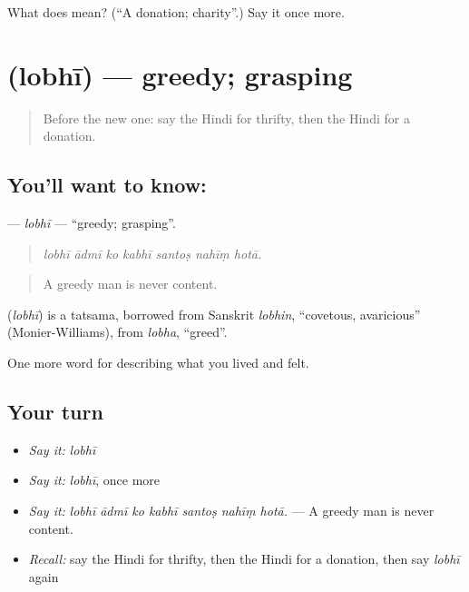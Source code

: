 \begin{tcolorbox}[breakable,colback=teal!4,colframe=teal!35!black,title={Before you move on}]
What does  mean? (\textquotedblleft{}A donation; charity\textquotedblright{}.) Say it once more.
\end{tcolorbox}
\section[\texorpdfstring{\hi{लोभी} (lobhī)}{लोभी (lobhī)}]{ (lobhī) — greedy; grasping}

\label{lesson:HI-C469-lobhi}



\begin{quote}
Before the new one: say the Hindi for thrifty, then the Hindi for a donation.
\end{quote}

\subsection*{You'll want to know: }
\textbf{} — \emph{lobhī} — \textquotedblleft{}greedy; grasping\textquotedblright{}.

\begin{quote}
      
\end{quote}

\begin{quote}
\emph{lobhī ādmī ko kabhī santoṣ nahīṃ hotā.}
\end{quote}

\begin{quote}
A greedy man is never content.
\end{quote}

\begin{cousinweb}
\textbf{} (\emph{lobhī}) is a tatsama, borrowed from Sanskrit \emph{lobhin}, \textquotedblleft{}covetous, avaricious\textquotedblright{} (Monier-Williams), from \emph{lobha}, \textquotedblleft{}greed\textquotedblright{}.
\end{cousinweb}

\begin{grammarlens}[title={What you've built}]
One more word for describing what you lived and felt.
\end{grammarlens}

\subsection*{Your turn}
\begin{itemize}
\raggedright
  \item \emph{Say it:} \emph{lobhī}
  \item \emph{Say it:} \emph{lobhī}, once more
  \item \emph{Say it:} \emph{lobhī ādmī ko kabhī santoṣ nahīṃ hotā.} — A greedy man is never content.
  \item \emph{Recall:} say the Hindi for thrifty, then the Hindi for a donation, then say \emph{lobhī} again
\end{itemize}

